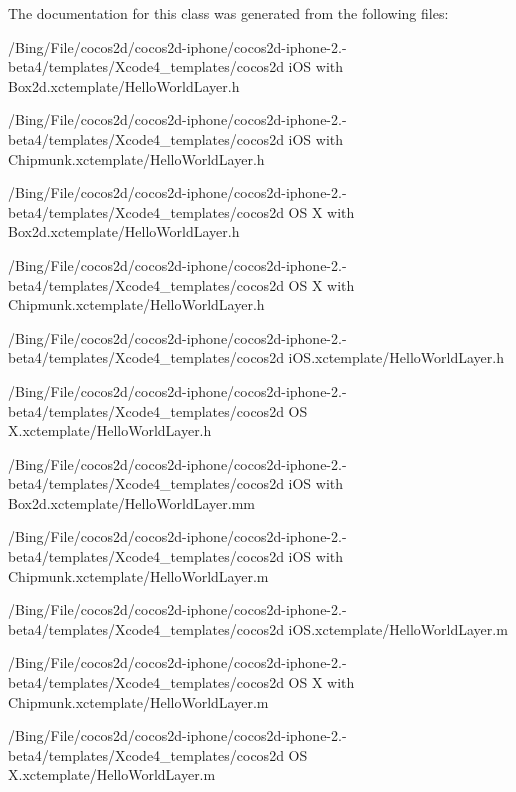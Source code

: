 The documentation for this class was generated from the following files\-:\begin{DoxyCompactItemize}
\item 
/\-Bing/\-File/cocos2d/cocos2d-\/iphone/cocos2d-\/iphone-\/2.-\/beta4/templates/\-Xcode4\-\_\-templates/cocos2d i\-O\-S with Box2d.\-xctemplate/Hello\-World\-Layer.\-h\item 
/\-Bing/\-File/cocos2d/cocos2d-\/iphone/cocos2d-\/iphone-\/2.-\/beta4/templates/\-Xcode4\-\_\-templates/cocos2d i\-O\-S with Chipmunk.\-xctemplate/Hello\-World\-Layer.\-h\item 
/\-Bing/\-File/cocos2d/cocos2d-\/iphone/cocos2d-\/iphone-\/2.-\/beta4/templates/\-Xcode4\-\_\-templates/cocos2d O\-S X with Box2d.\-xctemplate/Hello\-World\-Layer.\-h\item 
/\-Bing/\-File/cocos2d/cocos2d-\/iphone/cocos2d-\/iphone-\/2.-\/beta4/templates/\-Xcode4\-\_\-templates/cocos2d O\-S X with Chipmunk.\-xctemplate/Hello\-World\-Layer.\-h\item 
/\-Bing/\-File/cocos2d/cocos2d-\/iphone/cocos2d-\/iphone-\/2.-\/beta4/templates/\-Xcode4\-\_\-templates/cocos2d i\-O\-S.\-xctemplate/Hello\-World\-Layer.\-h\item 
/\-Bing/\-File/cocos2d/cocos2d-\/iphone/cocos2d-\/iphone-\/2.-\/beta4/templates/\-Xcode4\-\_\-templates/cocos2d O\-S X.\-xctemplate/Hello\-World\-Layer.\-h\item 
/\-Bing/\-File/cocos2d/cocos2d-\/iphone/cocos2d-\/iphone-\/2.-\/beta4/templates/\-Xcode4\-\_\-templates/cocos2d i\-O\-S with Box2d.\-xctemplate/Hello\-World\-Layer.\-mm\item 
/\-Bing/\-File/cocos2d/cocos2d-\/iphone/cocos2d-\/iphone-\/2.-\/beta4/templates/\-Xcode4\-\_\-templates/cocos2d i\-O\-S with Chipmunk.\-xctemplate/Hello\-World\-Layer.\-m\item 
/\-Bing/\-File/cocos2d/cocos2d-\/iphone/cocos2d-\/iphone-\/2.-\/beta4/templates/\-Xcode4\-\_\-templates/cocos2d i\-O\-S.\-xctemplate/Hello\-World\-Layer.\-m\item 
/\-Bing/\-File/cocos2d/cocos2d-\/iphone/cocos2d-\/iphone-\/2.-\/beta4/templates/\-Xcode4\-\_\-templates/cocos2d O\-S X with Chipmunk.\-xctemplate/Hello\-World\-Layer.\-m\item 
/\-Bing/\-File/cocos2d/cocos2d-\/iphone/cocos2d-\/iphone-\/2.-\/beta4/templates/\-Xcode4\-\_\-templates/cocos2d O\-S X.\-xctemplate/Hello\-World\-Layer.\-m\end{DoxyCompactItemize}
